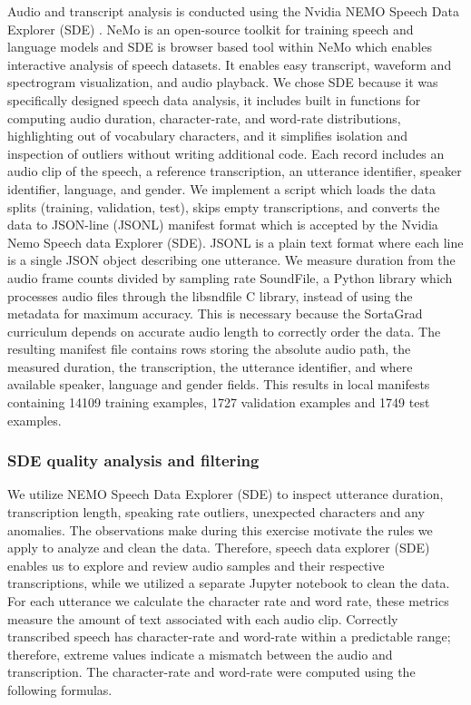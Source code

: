 {Audio and transcript analysis is conducted using the Nvidia NEMO Speech Data Explorer (SDE) \citep{Bakhturina2021}. NeMo is an open-source toolkit for training speech and language models and SDE is browser based tool within NeMo which enables interactive analysis of speech datasets. It enables easy transcript, waveform and spectrogram visualization, and audio playback. We chose SDE because it was specifically designed speech data analysis, it includes built in functions for computing audio duration, character-rate, and word-rate distributions, highlighting out of vocabulary characters, and it simplifies isolation and inspection of outliers without writing additional code. 
Each record includes an audio clip of the speech, a reference transcription, an utterance identifier, speaker identifier, language, and gender. We implement a script which loads the data splits (training, validation, test), skips empty transcriptions, and converts the data to JSON-line (JSONL) manifest format which is accepted by the Nvidia Nemo Speech data Explorer (SDE). JSONL is a plain text format where each line is a single JSON object describing one utterance. We measure duration from the audio frame counts divided by sampling rate SoundFile, a Python library which processes audio files through the libsndfile C library, instead of using the metadata for maximum accuracy. This is necessary because the SortaGrad curriculum depends on accurate audio length to correctly order the data. The resulting manifest file contains rows storing the absolute audio path, the measured duration, the transcription, the utterance identifier, and where available speaker, language and gender fields.
This results in local manifests containing 14109 training examples, 1727 validation examples and 1749 test examples.

\subsubsection{SDE quality analysis and filtering}

We utilize NEMO Speech Data Explorer (SDE) \citep{Bakhturina2021} to inspect utterance duration, transcription length, speaking rate outliers, unexpected characters and any anomalies. The observations make during this exercise motivate the rules we apply to analyze and clean the data. Therefore, speech data explorer (SDE) enables us to explore and review audio samples and their respective transcriptions, while we utilized a separate Jupyter notebook to clean the data. 
For each utterance we calculate the character rate and word rate, these metrics measure the amount of text associated with each audio clip. Correctly transcribed speech has character-rate and word-rate within a predictable range; therefore, extreme values indicate a mismatch between the audio and transcription. The character-rate and word-rate were computed using the following formulas.

}
